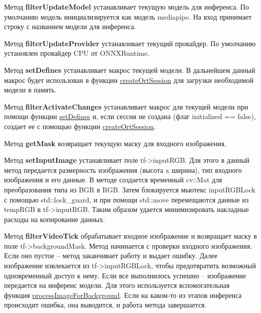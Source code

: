 \documentclass[a4paper,14pt]{extreport}
\begin{document}
        Метод \textbf{filterUpdateModel} устанавливает текущую модель для инференса. По умолчанию модель инициализируется как модель mediapipe. На вход принимает строку с названием модели для инференса.
        

        Метод \textbf{filterUpdateProvider} устанавливает текущий провайдер. По умолчанию установлен провайдер CPU от ONNXRuntime. 
        

        Метод \hypertarget{defines}{}\textbf{setDefines} устанавливает макрос текущей модели. В дальнейшем данный макрос будет использован в функции \hyperlink{createOrt}{createOrtSession} для загрузки необходимой модели в память.

        Метод \textbf{filterActivateChanges} устанавливает макрос для текущей модели при помощи функции \hyperlink{defines}{setDefines} и, если сессия не создана (флаг initialized == false), создает ее с помощью функции \hyperlink{createOrt}{createOrtSession}.

        Метод \textbf{getMask} возвращает текущую маску для входного изображения.

        Метод \textbf{setInputImage} устанавливает поле tf->inputRGB. Для этого в данный метод передается размерность изображения (высота x ширина), тип входного изображения и его данные. В методе создается временный cv::Mat для преобразования типа из BGR в RGB. Затем блокируется мьютекс inputRGBLock с помощью std::lock\_guard, и при помощи std::move перемещаются данные из tempRGB в tf->inputRGB. Таким образом удается минимизировать накладные расходы на копирование данных.
        

        Метод \textbf{filterVideoTick} обрабатывает входное изображение и возвращает маску в поле tf->backgroundMask. Метод начинается с проверки входного изображения. Если оно пустое -- метод заканчивает работу и выдает ошибку. Далее изображение извлекается из tf->inputRGBLock, чтобы предотвратить возможный одновременный доступ к нему. Если все выполнилось успешно -- изображение передается на инференс модели. Для этого используется вспомогательная функция \hyperlink{imageForBackground}{processImageForBackground}. Если на каком-то из этапов инференса происходит ошибка, она выводится, и работа метода завершается.
        
\end{document}
